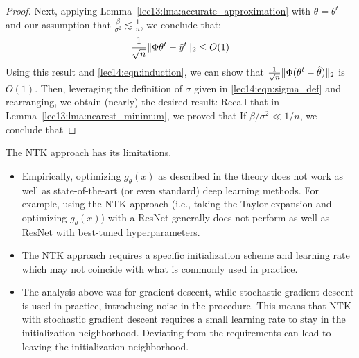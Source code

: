\begin{proof}
Next, applying Lemma~\ref{lec13:lma:accurate_approximation} with $\theta = \theta^t$ and our assumption that $\frac{\beta}{\sigma^2} \lesssim \frac{1}{n}$, we conclude that:
\begin{align}
    \frac{1}{\sqrt{n}} \|\Phi \theta^t - \hat{y}^t\|_2 \leq O(1)
\end{align}
Using this result and \eqref{lec14:eqn:induction}, we can show that $\frac{1}{\sqrt{n}} \|\Phi(\theta^t - \hat{\theta})\|_2$ is $O(1)$.
Then, leveraging the definition of $\sigma$ given in \eqref{lec14:eqn:sigma_def} and rearranging, we obtain (nearly) the desired result:
Recall that in Lemma~\ref{lec13:lma:nearest_minimum}, we proved that 
If $\beta/\sigma^2 \ll 1/n$, we conclude that
\end{proof}

The NTK approach has its limitations.
\begin{itemize}
    \item Empirically, optimizing $g_\theta(x)$ as described in the theory does not work as well as state-of-the-art (or even standard) deep learning methods. For example, using the NTK approach (i.e., taking the Taylor expansion and optimizing $g_{\theta}(x)$) with a ResNet generally does not perform as well as ResNet with best-tuned hyperparameters.
    
    \item The NTK approach requires a specific initialization scheme and learning rate which may not coincide with what is commonly used in practice.
    
    \item The analysis above was for gradient descent, while stochastic gradient descent is used in practice, introducing noise in the procedure. This means that NTK with stochastic gradient descent requires a small learning rate to stay in the initialization neighborhood. Deviating from the requirements can lead to leaving the initialization neighborhood.
\end{itemize}


